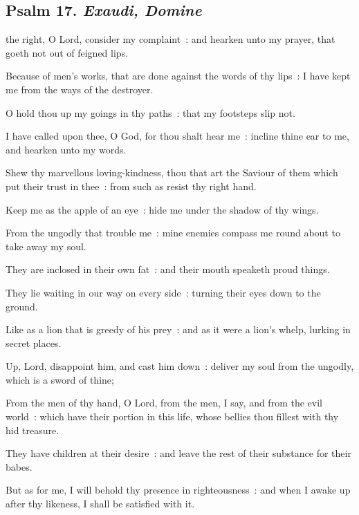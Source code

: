 \clearpage
\subsection{Psalm 17. \textit{Exaudi, Domine}}

 the right, O Lord, consider my complaint~: and hearken unto my prayer, that goeth not out of feigned lips.\par
{}
Because of men's works, that are done against the words of thy lips~: I have kept me from the ways of the destroyer.\par
{}O hold thou up my goings in thy paths~: that my footsteps slip not.\par
{}I have called upon thee, O God, for thou shalt hear me~: incline thine ear to me, and hearken unto my words.\par
{}Shew thy marvellous loving-kindness, thou that art the Saviour of them which put their trust in thee~: from such as resist thy right hand.\par
{}Keep me as the apple of an eye~: hide me under the shadow of thy wings.\par
{}From the ungodly that trouble me~: mine enemies compass me round about to take away my soul.\par
{}They are inclosed in their own fat~: and their mouth speaketh proud things.\par
{}They lie waiting in our way on every side~: turning their eyes down to the ground.\par
{}Like as a lion that is greedy of his prey~: and as it were a lion's whelp, lurking in secret places.\par
{}Up, Lord, disappoint him, and cast him down~: deliver my soul from the ungodly, which is a sword of thine;\par
{}From the men of thy hand, O Lord, from the men, I say, and from the evil world~: which have their portion in this life, whose bellies thou fillest with thy hid treasure.\par
{}They have children at their desire~: and leave the rest of their substance for their babes.\par
{}But as for me, I will behold thy presence in righteousness~: and when I awake up after thy likeness, I shall be satisfied with it.\par

